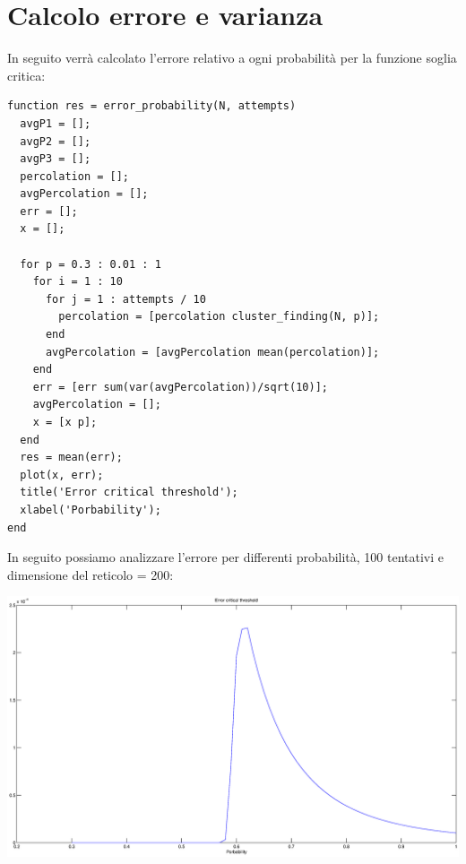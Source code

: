 \documentclass[10pt,a4paper]{article}
\begin{document}
\section{Calcolo errore e varianza}
In seguito verrà calcolato l’errore relativo a ogni probabilità per la funzione soglia critica:
\begin{lstlisting}[caption={error\_probability.m}, label=usless]
function res = error_probability(N, attempts)
  avgP1 = [];
  avgP2 = [];
  avgP3 = [];
  percolation = [];
  avgPercolation = [];
  err = [];
  x = [];
    
  for p = 0.3 : 0.01 : 1
    for i = 1 : 10
      for j = 1 : attempts / 10
        percolation = [percolation cluster_finding(N, p)];
      end
      avgPercolation = [avgPercolation mean(percolation)];
    end
    err = [err sum(var(avgPercolation))/sqrt(10)];
    avgPercolation = [];
    x = [x p];
  end
  res = mean(err);
  plot(x, err);
  title('Error critical threshold');
  xlabel('Porbability');
end
\end{lstlisting}
\newpage
In seguito possiamo analizzare l'errore per differenti probabilità, 100 tentativi e dimensione del reticolo = 200:

\centerline{\includegraphics[scale=0.5]{error.eps}}
\end{document}
